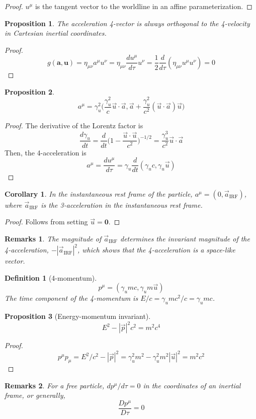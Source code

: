 \documentclass[a4paper]{article}
\newtheorem{remarks}{Remarks}[section]
\theoremstyle{new}
\newtheorem{defi}{Definition}[section]
\newtheorem{prop}{Proposition}[section]
\newtheorem{cor}{Corollary}[section]
\begin{document}
\begin{proof}
$u^\mu$ is the tangent vector to the worldline in an affine parameterization.
\end{proof}
\begin{prop}
The acceleration 4-vector is always orthogonal to the 4-velocity in Cartesian inertial coordinates.
\end{prop}
\begin{proof}
$$g(\mathbf{a},\mathbf{u})=\eta_{\mu\nu}a^\mu u^\nu=\eta_{\mu\nu}\frac{du^\mu}{d\tau}u^\nu=\frac{1}{2}\frac{d}{d\tau}(\eta_{\mu\nu}u^\mu u^\nu)=0$$
\end{proof}
\begin{prop}
$$a^\mu=\gamma_u^2\bigg(\frac{\gamma_u^2}{c}\vec{u}\cdot\vec{a},\vec{a}+\frac{\gamma_u^2}{c^2}(\vec{u}\cdot\vec{a})\vec{u}\bigg)$$
\end{prop}
\begin{proof}
The derivative of the Lorentz factor is
$$\frac{d\gamma_u}{dt}=\frac{d}{dt}\bigg(1-\frac{\vec{u}\cdot\vec{u}}{c^2}\bigg)^{-1/2}=\frac{\gamma_u^3}{c^2}\vec{u}\cdot\vec{a}$$
Then, the 4-acceleration is
$$a^\mu=\frac{du^\mu}{d\tau}=\gamma_u\frac{d}{dt}(\gamma_uc,\gamma_u\vec{u})$$
\end{proof}
\begin{cor}
In the instantaneous rest frame of the particle, $a^\mu=(0,\vec{a}_{\text{IRF}})$, where $\vec{a}_{\text{IRF}}$ is the 3-acceleration in the instantaneous rest frame.
\end{cor}
\begin{proof}
Follows from setting $\vec{u}=\boldsymbol{0}$.
\end{proof}
\begin{remarks}
The magnitude of $\vec{a}_{\text{IRF}}$ determines the invariant magnitude of the 4-acceleration, $-|\vec{a}_{\text{IRF}}|^2$, which shows that the 4-acceleration is a space-like vector.
\end{remarks}
\begin{defi}[4-momentum]
$$p^\mu=(\gamma_umc,\gamma_um\vec{u})$$
The time component of the 4-momentum is $E/c=\gamma_umc^2/c=\gamma_umc$.
\end{defi}
\begin{prop}[Energy-momentum invariant]
$$E^2-|\vec{p}|^2c^2=m^2c^4$$
\end{prop}
\begin{proof}
$$p^\mu p_\mu=E^2/c^2-|\vec{p}|^2=\gamma_u^2m^2-\gamma_u^2m^2|\vec{u}|^2=m^2c^2$$
\end{proof}
\begin{remarks}
For a free particle, $dp^\mu/d\tau=0$ in the coordinates of an inertial frame, or generally,
$$\frac{Dp^\mu}{D\tau}=0$$
\end{remarks}
\end{document}
